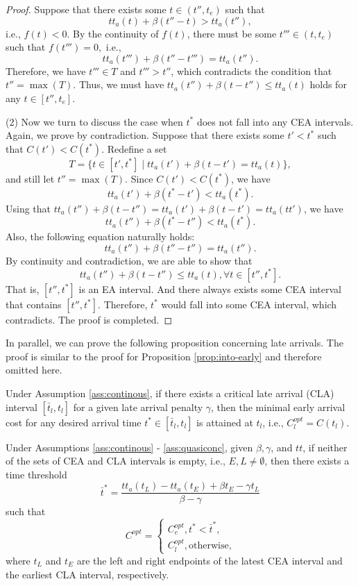 \begin{proof}
Suppose that there exists some $t \in (t'',  t_e)$ such that $$tt_a(t)  + \beta (t'' - t ) >  tt_a(t'' ),$$ i.e., $f(t) <0$. By the continuity of $f(t)$, there must be some $t''' \in (t, t_e)$ such that $f(t''')=0,$ i.e., $$tt_a(t''')  + \beta (t'' - t''' ) =  tt_a(t'' ).$$
Therefore, we have $t''' \in T$ and $t''' > t''$, which contradicts the condition that $t'' =\max(T)$. Thus, we must have $ tt_a(t'')  + \beta (t - t'' ) \le  tt_a(t )$ holds for any $ t \in [t'',  t_e]$. 

(2) Now we turn to discuss the case when $t^*$ does not fall into any CEA intervals. Again, we prove by contradiction. Suppose that there exists some $t' < t^*$ such that $C(t') < C(t^*)$. Redefine a set 
\begin{equation}\label{eq:def_T_2}
    T = \{t \in [t', t^*] \mid tt_a(t')  + \beta (t - t' ) =  tt_a(t )\}, 
\end{equation} 
and still let $t'' = \max(T)$. Since $C(t') < C(t^*)$, we have 
$$tt_a(t') + \beta (t^* - t') < tt_a(t^*).$$
Using that $tt_a(t'')  + \beta (t - t'' )  = tt_a(t')  + \beta (t - t' )  = tt_a(tt') $, we have 
$$tt_a(t'') + \beta (t^* - t'') < tt_a(t^*).$$
Also, the following equation naturally holds: 
$$tt_a(t'') + \beta (t'' - t'') = tt_a(t'').$$
By continuity and contradiction,  we are able to show that $$tt_a(t'') + \beta (t - t'') \le tt_a(t), \forall t \in [t'', t^*].$$
That is, $[t'', t^*] $ is an EA interval. And there always exists some CEA interval that contains $[t'', t^*]$. Therefore, $t^*$ would fall into some CEA interval, which contradicts.  The proof is completed.  


\end{proof}

In parallel, we can prove the following proposition concerning late arrivals. The proof is similar to the proof for Proposition \ref{prop:into-early} and therefore omitted here. 
\begin{prop}
  \label{prop:into-late}
Under Assumption \ref{ass:continous}, if there exists a critical late arrival (CLA) interval $[\bar t_l, t_l]$ for a given late arrival penalty $\gamma$, then the minimal early arrival cost for any desired arrival time $t^* \in [\bar t_l, t_l]$ is attained at $t_l$, i.e., 
$C_l^{opt} = C(t_l)$.
\end{prop}



\begin{prop}
   Under Assumptions \ref{ass:continous} - \ref{ass:quasiconc}, given $\beta, \gamma$, and $tt$, if neither of the sets of CEA and CLA intervals is empty, i.e., $E, L \neq \emptyset$, then there exists a time threshold $$\bar t^* = \frac{tt_a(t_L) - tt_a(t_E) + \beta t_E - \gamma t_L}{\beta - \gamma}$$
   such that 
$$C^{opt}  = \begin{cases}
    C^{opt}_e  , t^* < \bar t^*, \\
     C^{opt}_l, \text{otherwise,}
\end{cases}$$
where $t_L$ and $t_E$ are the left and right endpoints of the latest CEA interval and the earliest CLA interval, respectively. 
\end{prop}

